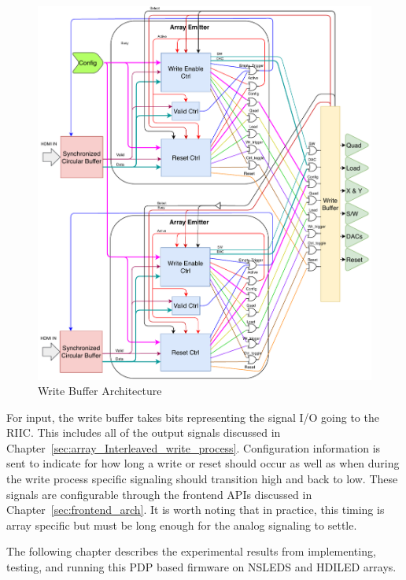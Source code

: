     \begin{figure}[H]
        \centering
        \includegraphics[width=1.0\textwidth]{fig/pdp_wb_arch.pdf}
        \caption{Write Buffer Architecture}
        \label{fig:wb_arch}
    \end{figure}

    For input, the write buffer takes bits representing the signal I/O going to the RIIC. This includes all of the output signals discussed in Chapter~\ref{sec:array_Interleaved_write_process}. Configuration information is sent to indicate for how long a write or reset should occur as well as when during the write process specific signaling should transition high and back to low. These signals are configurable through the frontend APIs discussed in Chapter~\ref{sec:frontend_arch}. It is worth noting that in practice, this timing is array specific but must be long enough for the analog signaling to settle.

    The following chapter describes the experimental results from implementing, testing, and running this PDP based firmware on NSLEDS and HDILED arrays.
